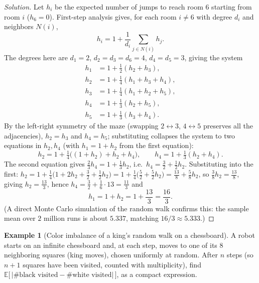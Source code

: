 \documentclass[11pt]{article}
\theoremstyle{definition}
\newtheorem{example}{Example}[section]
\newcommand{\E}{\mathbb{E}}
\begin{document}
\begin{proof}[Solution]
Let $h_i$ be the expected number of jumps to reach room $6$ starting from room $i$ ($h_6=0$). First-step analysis gives, for each room $i\neq6$ with degree $d_i$ and neighbors $N(i)$,
\[
h_i = 1+\frac1{d_i}\sum_{j\in N(i)} h_j.
\]
The degrees here are $d_1=2$, $d_2=d_3=d_6=4$, $d_4=d_5=3$, giving the system
\[
\begin{aligned}
h_1 &= 1+\tfrac12(h_2+h_3), \\
h_2 &= 1+\tfrac14(h_1+h_3+h_4), \\
h_3 &= 1+\tfrac14(h_1+h_2+h_5), \\
h_4 &= 1+\tfrac13(h_2+h_5), \\
h_5 &= 1+\tfrac13(h_3+h_4).
\end{aligned}
\]
By the left-right symmetry of the maze (swapping $2\leftrightarrow3$, $4\leftrightarrow5$ preserves all the adjacencies), $h_2=h_3$ and $h_4=h_5$; substituting collapses the system to two equations in $h_2,h_4$ (with $h_1=1+h_2$ from the first equation):
\[
h_2 = 1+\tfrac14\big((1+h_2)+h_2+h_4\big), \qquad h_4=1+\tfrac13(h_2+h_4).
\]
The second equation gives $\tfrac23h_4=1+\tfrac13h_2$, i.e.\ $h_4=\tfrac32+\tfrac12h_2$. Substituting into the first: $h_2=1+\tfrac14\big(1+2h_2+\tfrac32+\tfrac12h_2\big)=1+\tfrac14\big(\tfrac52+\tfrac52h_2\big)=\tfrac{13}8+\tfrac58h_2$, so $\tfrac38h_2=\tfrac{13}8$, giving $h_2=\tfrac{13}3$, hence $h_4=\tfrac32+\tfrac16\cdot13=\tfrac{11}3$ and
\[
h_1 = 1+h_2 = 1+\frac{13}3=\boxed{\frac{16}{3}}.
\]
(A direct Monte Carlo simulation of the random walk confirms this: the sample mean over $2$ million runs is about $5.337$, matching $16/3\approx5.333$.)
\end{proof}

\begin{example}[Color imbalance of a king's random walk on a chessboard]
A robot starts on an infinite chessboard and, at each step, moves to one of its $8$ neighboring squares (king moves), chosen uniformly at random. After $n$ steps (so $n+1$ squares have been visited, counted with multiplicity), find $\E\big[\,|\#\text{black visited} - \#\text{white visited}|\,\big]$, as a compact expression.

\end{example}
\end{document}
